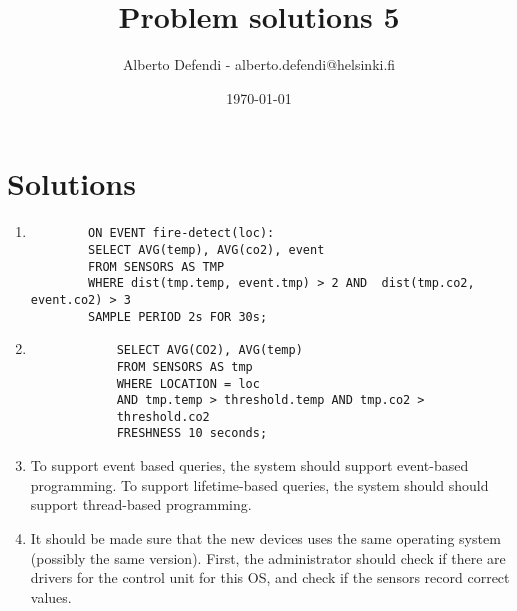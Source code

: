 \documentclass[a4paper, 12pt]{article}
\title{Problem solutions 5}
\author{Alberto Defendi - alberto.defendi@helsinki.fi}
\date{\today}
\begin{document}
\maketitle

\section{Solutions} %
\label{sec:solutions}

\begin{exercise}
\begin{enumerate}
    \item 
		\begin{verbatim}
		ON EVENT fire-detect(loc):
		SELECT AVG(temp), AVG(co2), event 
		FROM SENSORS AS TMP 
		WHERE dist(tmp.temp, event.tmp) > 2 AND  dist(tmp.co2, event.co2) > 3
		SAMPLE PERIOD 2s FOR 30s;
		\end{verbatim}
	\item
		\begin{verbatim}
		    SELECT AVG(CO2), AVG(temp) 
			FROM SENSORS AS tmp 
			WHERE LOCATION = loc 
			AND tmp.temp > threshold.temp AND tmp.co2 >
			threshold.co2
			FRESHNESS 10 seconds;
		\end{verbatim}
	\item To support event based queries, the system should support event-based
		programming. To support lifetime-based queries, the system should
		should support thread-based programming.
	\item It should be made sure that the new devices uses the same operating
		system (possibly the same version). First, the administrator should check if
		there are drivers for the control unit for this OS, and check if the
		sensors record correct values.
\end{enumerate}
\end{exercise}
\end{document}
